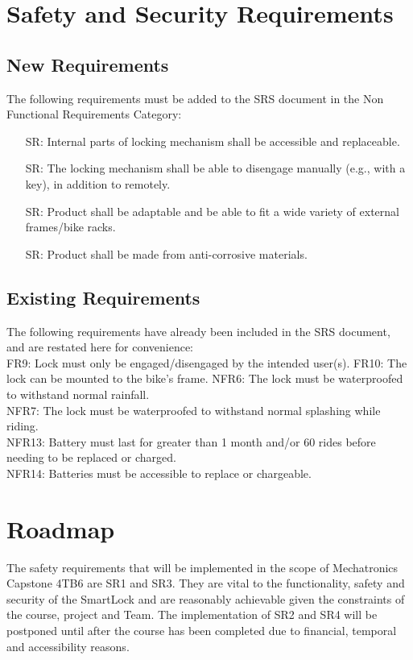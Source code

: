 \documentclass{article}
\newcounter{srnum} %
\begin{document}
\section{Safety and Security Requirements}
\subsection{New Requirements}
The following requirements must be added to the SRS document in the Non Functional Requirements Category:
\begin{itemize}
\item[SR\refstepcounter{srnum}\thesrnum\label{SR1}:] Internal parts of locking mechanism shall be accessible and replaceable.
\item[SR\refstepcounter{srnum}\thesrnum\label{SR2}:] The locking mechanism shall be able to disengage manually (e.g., with a key), in addition to remotely.
\item[SR\refstepcounter{srnum}\thesrnum\label{SR3}:] Product shall be adaptable and be able to fit a wide variety of external frames/bike racks.
\item[SR\refstepcounter{srnum}\thesrnum\label{SR4}:] Product shall be made from anti-corrosive materials. 
\end{itemize}

\subsection{Existing Requirements}

The following requirements have already been included in the SRS document, and are restated here for convenience: \\

 \noindent FR9: Lock must only be engaged/disengaged by the intended user(s). \newline 
 FR10: The lock can be mounted to the bike's frame. \newline
 NFR6: The lock must be waterproofed to withstand normal rainfall. \\
 NFR7: The lock must be waterproofed to withstand normal splashing while riding. \\
 NFR13: Battery must last for greater than 1 month and/or 60 rides before needing to be replaced or charged. \\
 NFR14: Batteries must be accessible to replace or chargeable. \\


\section{Roadmap}
The safety requirements that will be implemented in the scope of Mechatronics Capstone 4TB6 are SR1 and SR3. They are vital to the functionality, safety and security of the SmartLock and are reasonably achievable given the constraints of the course, project and Team. The implementation of SR2 and SR4 will be postponed until after the course has been completed due to financial, temporal and accessibility reasons. 
\end{document}
